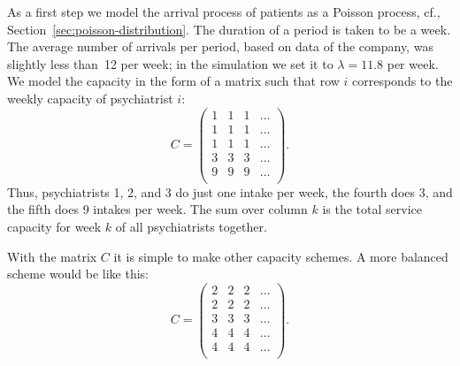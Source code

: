 As a first step we model the arrival process of patients as a Poisson process, cf., Section~\ref{sec:poisson-distribution}.
The duration of a period is taken to be a week.
The average number of arrivals per period, based on data of the company, was slightly less than~12 per week; in the simulation we set it to $\lambda= 11.8$ per week.
We model the capacity in the form of a matrix such that row $i$ corresponds to the weekly capacity of psychiatrist $i$:
\begin{equation*}
C = 
  \begin{pmatrix}
    1 & 1 & 1 & \ldots\\
    1 & 1 & 1 & \ldots\\
    1 & 1 & 1 & \ldots\\
    3 & 3 & 3 & \ldots\\
    9 & 9 & 9 & \ldots\\
  \end{pmatrix}.
\end{equation*}
Thus, psychiatrists 1, 2, and 3 do just one intake per week, the
fourth does 3, and the fifth does 9 intakes per week. The sum over
column $k$ is the total service capacity for week $k$ of all
psychiatrists together.

With the matrix $C$ it is simple to make other capacity schemes. A
more balanced scheme would be like this:
\begin{equation*}
C = 
  \begin{pmatrix}
    2 & 2 & 2 & \ldots\\
    2 & 2 & 2 & \ldots\\
    3 & 3 & 3 & \ldots\\
    4 & 4 & 4 & \ldots\\
    4 & 4 & 4 & \ldots\\
  \end{pmatrix}.
\end{equation*}

